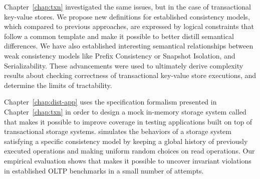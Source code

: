 Chapter~\ref{chap:txn} investigated the same issues, but in the case of transactional key-value stores. We propose new definitions for established consistency models, which compared to previous approaches, are expressed by logical constraints that follow a common template and make it possible to better distill semantical differences. We have also established interesting semantical relationships between weak consistency models like Prefix Consistency or Snapshot Isolation, and Serializability. These advancements were used to ultimately derive complexity results about checking correctness of transactional key-value store executions, and determine the limits of tractability. 


Chapter~\ref{chap:dist-app} uses the specification formalism presented in Chapter~\ref{chap:txn} in order to design a mock in-memory storage system called \tool{} that makes it possible to improve coverage in testing applications built on top of transactional storage systems. \tool{} simulates the behaviors of a storage system satisfying a specific consistency model by keeping a global history of previously executed operations and making uniform random choices on read operations. Our empirical evaluation shows that \tool{} makes it possible to uncover invariant violations in established OLTP benchmarks in a small number of attempts.


